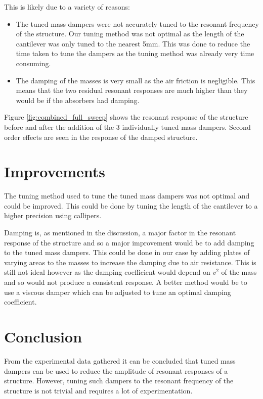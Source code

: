 \documentclass[8pt]{article}
\begin{document}
This is likely due to a variety of reasons:
\begin{itemize}
    \item The tuned mass dampers were not accurately tuned to the resonant frequency of the structure. Our tuning method was not optimal as the length of the cantilever was only tuned to the nearest 5mm.
            This was done to reduce the time taken to tune the dampers as the tuning method was already very time consuming.
    \item The damping of the masses is very small as the air friction is negligible. This means that the two residual resonant responses are much higher than they would be if the absorbers had damping.
\end{itemize}

Figure \ref{fig:combined_full_sweep} shows the resonant response of the structure before and after the addition of the 3 individually tuned mass dampers.
Second order effects are seen in the response of the damped structure.

\section{Improvements}

The tuning method used to tune the tuned mass dampers was not optimal and could be improved.
This could be done by tuning the length of the cantilever to a higher precision using callipers.

Damping is, as mentioned in the discussion, a major factor in the resonant response of the structure and so
a major improvement would be to add damping to the tuned mass dampers. This could be done in our case 
by adding plates of varying areas to the masses to increase the damping due to air resistance.
This is still not ideal however as the damping coefficient would depend on $v^2$ of the mass and so would not produce a consistent response.
A better method would be to use a viscous damper which can be adjusted to tune an optimal damping coefficient.

\section{Conclusion}

From the experimental data gathered it can be concluded that tuned mass dampers can be used to reduce the amplitude of resonant responses of a structure.
However, tuning such dampers to the resonant frequency of the structure is not trivial and requires a lot of experimentation.
\end{document}
